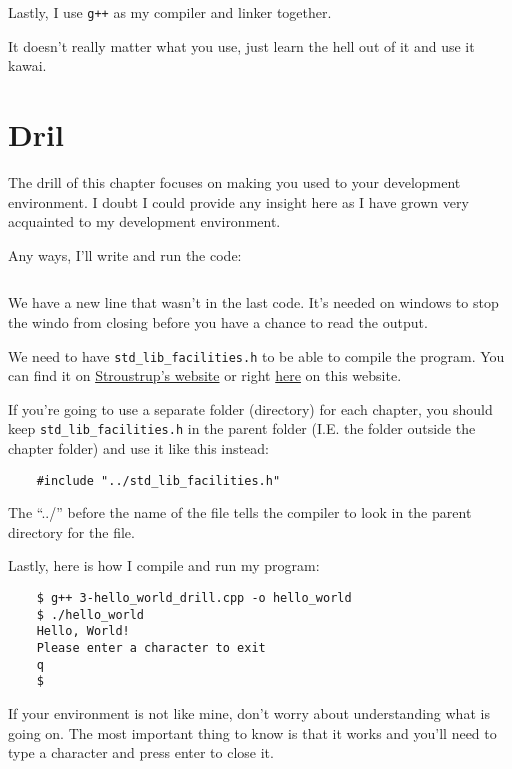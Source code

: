 \documentclass{book}
\begin{document}
Lastly, I use \verb|g++| as my compiler and linker together.

It doesn't really matter what you use, just learn the hell out of it and use it kawai.

\section{Dril}
The drill of this chapter focuses on making you used to your development environment. I doubt I could provide any insight here as I have grown very acquainted to my development environment.

Any ways, I'll write and run the code:

\inputminted[linenos, frame=lines, fontsize=\small]{c++}{./csc-201/3-hello_world_drill.cpp}

We have a new line that wasn't in the last code. It's needed on windows to stop the windo from closing before you have a chance to read the output.

We need to have \verb|std_lib_facilities.h| to be able to compile the program. You can find it on \href{https://stroustrup.com/std_lib_facilities.h}{Stroustrup's website} or right \href{./csc-201/std_lib_facilities.h}{here} on this website.

If you're going to use a separate folder (directory) for each chapter, you should keep \verb|std_lib_facilities.h| in the parent folder (I.E. the folder outside the chapter folder) and use it like this instead:

\begin{verbatim}
	#include "../std_lib_facilities.h"
\end{verbatim}

The ``../'' before the name of the file tells the compiler to look in the parent directory for the file.

Lastly, here is how I compile and run my program:

\begin{verbatim}
	$ g++ 3-hello_world_drill.cpp -o hello_world
	$ ./hello_world
	Hello, World!
	Please enter a character to exit
	q
	$
\end{verbatim}

If your environment is not like mine, don't worry about understanding what is going on. The most important thing to know is that it works and you'll need to type a character and press enter to close it.
\end{document}
